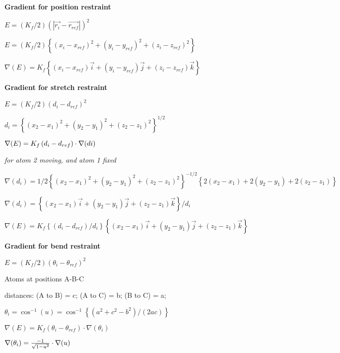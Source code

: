 {\bf Gradient for position restraint}

$E=\left( K_{f}/2\right) \left( \left| \overrightarrow{r_{i}}-
\overrightarrow{r_{ref}}\right| \right) ^{2}$

$E=\left( K_{f}/2\right) \left\{ \left( x_{i}-x_{ref}\right) ^{2}+\left(
y_{i}-y_{ref}\right) ^{2}+\left( z_{i}-z_{ref}\right) ^{2}\right\} $

$\nabla (E)=K_{f}\left\{ \left( x_{i}-x_{ref}\right) \overrightarrow{i}
+\left( y_{i}-y_{ref}\right) \overrightarrow{j}+\left( z_{i}-z_{ref}\right) 
\overrightarrow{k}\right\} $

{\bf Gradient for stretch restraint}

$E=\left( K_{f}/2\right) \left( d_{i}-d_{ref}\right) ^{2}$

$d_{i}=\left\{ \left( x_{2}-x_{1}\right) ^{2}+\left( y_{2}-y_{1}\right)
^{2}+\left( z_{2}-z_{1}\right) ^{2}\right\} ^{1/2}$

$\nabla (E)=K_{f}\left( d_{i}-d_{ref}\right) \cdot \nabla (di)\medskip $

{\em for atom 2 moving, and atom 1 fixed}

$\nabla (d_{i})=1/2\left\{ \left( x_{2}-x_{1}\right) ^{2}+\left(
y_{2}-y_{1}\right) ^{2}+\left( z_{2}-z_{1}\right) ^{2}\right\}
^{-1/2}\left\{ 2\left( x_{2}-x_{1}\right) +2\left( y_{2}-y_{1}\right)
+2\left( z_{2}-z_{1}\right) \right\} $

$\nabla (d_{i})=\left\{ \left( x_{2}-x_{1}\right) \overrightarrow{i}+\left(
y_{2}-y_{1}\right) \overrightarrow{j}+\left( z_{2}-z_{1}\right) 
\overrightarrow{k}\right\} /d_{i}$

$\nabla (E)=K_{f}\left\{ \left( d_{i}-d_{ref}\right) /d_{i}\right\} \left\{
\left( x_{2}-x_{1}\right) \overrightarrow{i}+\left( y_{2}-y_{1}\right) 
\overrightarrow{j}+\left( z_{2}-z_{1}\right) \overrightarrow{k}\right\} $

{\bf Gradient for bend restraint}

$E=\left( K_{f}/2\right) \left( \theta _{i}-\theta _{ref}\right) ^{2}$

Atoms at positions A-B-C

distances: (A to B) = c; (A to C) = b; (B to C) = a;

$\theta _{i}=\cos ^{-1}(u)=\cos ^{-1}\left\{ \left( a^{2}+c^{2}-b^{2}\right)
/\left( 2ac\right) \right\} $

$\nabla (E)=K_{f}\left( \theta _{i}-\theta _{ref}\right) \cdot \nabla
(\theta _{i})$

$\nabla (\theta _{i})=\frac{-1}{\sqrt{1-u^{2}}}\cdot \nabla (u)\medskip $

